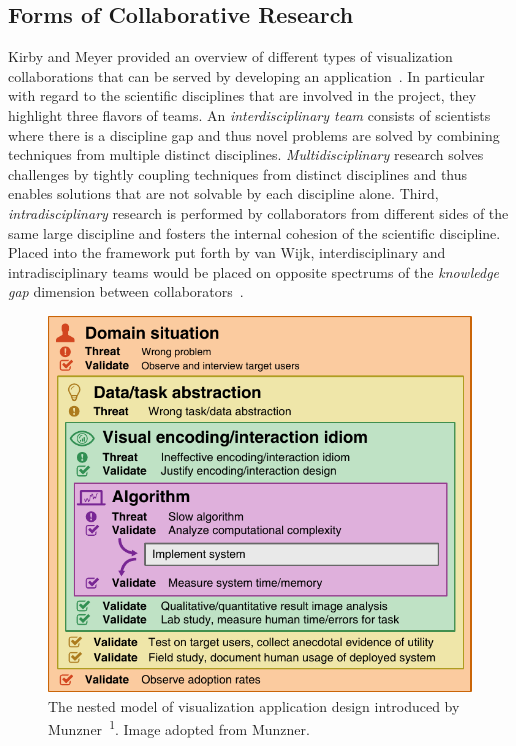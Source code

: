 \subsection{Forms of Collaborative Research} \label{cha:intro:appl:collab}
Kirby and Meyer provided an overview of different types of visualization collaborations that can be served by developing an application~\cite{kirby2013visualization}.  In particular with regard to the scientific disciplines that are involved in the project, they highlight three flavors of teams. An \emph{interdisciplinary team} consists of scientists where there is a discipline gap and thus novel problems are solved by combining techniques from multiple distinct disciplines.  \emph{Multidisciplinary} research solves challenges by tightly coupling techniques from distinct disciplines and thus enables solutions that are not solvable by each discipline alone.  Third, \emph{intradisciplinary} research is performed by collaborators from different sides of the same large discipline and fosters the internal cohesion of the scientific discipline.  Placed into the framework put forth by van Wijk, interdisciplinary and intradisciplinary teams would be placed on opposite spectrums of the \emph{knowledge gap} dimension between collaborators~\cite{van2006bridging}.

\begin{figure}
  \centering
  \includegraphics[width=\abfboximagewidth]{figures/intro/design_model.pdf}
  \caption{The nested model of visualization application design introduced by Munzner~\cite{munzner2009nested}\textsuperscript{1}.  Image adopted from Munzner.}
  \label{fig:intro:appl:nested}
\end{figure}


